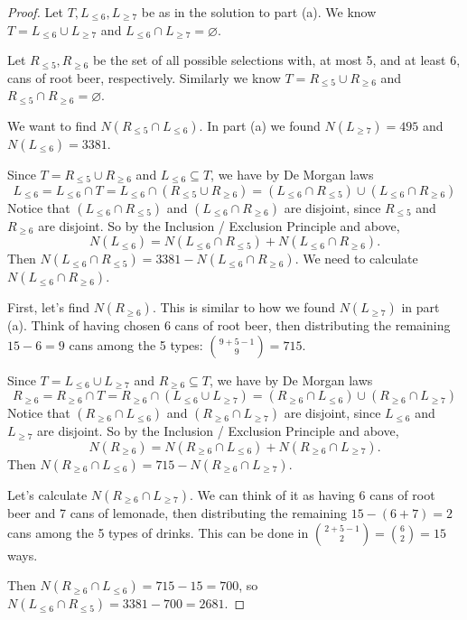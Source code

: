 \documentclass[14pt]{extarticle}
\newcommand{\es}{\varnothing}
\begin{document}
\begin{proof}
     Let \(T, L_{\leq 6}, L_{\geq 7}\) be as in the solution to part (a). We know \(T = L_{\leq 6}\cup L_{\geq 7}\) and
     \(L_{\leq 6} \cap L_{\geq 7} = \es\).

     Let \(R_{\leq 5}, R_{\geq 6}\) be the set of all possible selections with, at most 5, and at least 6, cans of root beer,
     respectively. Similarly we know \(T = R_{\leq 5}\cup R_{\geq 6}\) and \(R_{\leq 5} \cap R_{\geq 6} = \es\).

     We want to find \(N(R_{\leq 5} \cap L_{\leq 6})\). In part (a) we found \(N(L_{\geq 7}) = 495\) and \(N(L_{\leq 6}) = 3381\).

     Since \(T = R_{\leq 5} \cup R_{\geq 6}\) and \(L_{\leq 6} \subseteq T\), we have by De Morgan laws
     \[
          L_{\leq 6} = L_{\leq 6} \cap T = L_{\leq 6} \cap (R_{\leq 5} \cup R_{\geq 6}) = (L_{\leq 6} \cap R_{\leq 5}) \cup
          (L_{\leq 6} \cap R_{\geq 6})
     \]
     Notice that \((L_{\leq 6} \cap R_{\leq 5})\) and \((L_{\leq 6} \cap R_{\geq 6})\) are disjoint, since \(R_{\leq 5}\) and
     \(R_{\geq 6}\) are disjoint. So by the Inclusion / Exclusion Principle and above,
     \[
          N(L_{\leq 6}) = N(L_{\leq 6} \cap R_{\leq 5}) + N(L_{\leq 6} \cap R_{\geq 6}).
     \]
     Then \(N(L_{\leq 6} \cap R_{\leq 5}) = 3381 - N(L_{\leq 6} \cap R_{\geq 6})\). We need to calculate \(N(L_{\leq 6} \cap
     R_{\geq 6})\).

     First, let's find \(N(R_{\geq 6})\). This is similar to how we found \(N(L_{\geq 7})\) in part (a). Think of having chosen 6
     cans of root beer, then distributing the remaining \(15-6=9\) cans among the 5 types: \(\binom{9+5-1}{9} = 715\).

     Since \(T = L_{\leq 6} \cup L_{\geq 7}\) and \(R_{\geq 6} \subseteq T\), we have by De Morgan laws
     \[
          R_{\geq 6} = R_{\geq 6} \cap T = R_{\geq 6} \cap (L_{\leq 6} \cup L_{\geq 7}) = (R_{\geq 6} \cap L_{\leq 6}) \cup
          (R_{\geq 6} \cap L_{\geq 7})
     \]
     Notice that \((R_{\geq 6} \cap L_{\leq 6})\) and \((R_{\geq 6} \cap L_{\geq 7})\) are disjoint, since \(L_{\leq 6}\) and
     \(L_{\geq 7}\) are disjoint. So by the Inclusion / Exclusion Principle and above,
     \[
          N(R_{\geq 6}) = N(R_{\geq 6} \cap L_{\leq 6}) + N(R_{\geq 6} \cap L_{\geq 7}).
     \]
     Then \(N(R_{\geq 6} \cap L_{\leq 6}) = 715 - N(R_{\geq 6} \cap L_{\geq 7})\).

     Let's calculate \(N(R_{\geq 6} \cap L_{\geq 7})\). We can think of it as having 6 cans of root beer and 7 cans of
     lemonade, then distributing the remaining \(15-(6+7) = 2\) cans among the 5 types of drinks. This can be done in
     \(\binom{2+5-1}{2} = \binom{6}{2} = 15\) ways.

     Then \(N(R_{\geq 6} \cap L_{\leq 6}) = 715 - 15 = 700\), so \(N(L_{\leq 6} \cap R_{\leq 5}) = 3381 - 700 = 2681\).
\end{proof}
\end{document}
